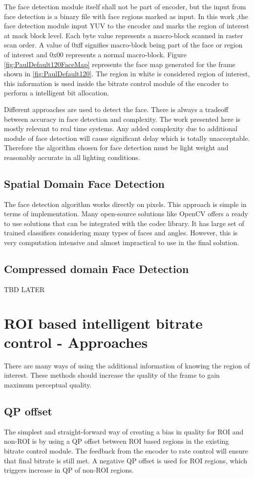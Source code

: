 \documentclass[11pt]{article} %
\begin{document}
 The face detection module itself shall not be part of encoder, but the input from face detection is a binary file with face regions marked as input. In this work ,the face detection module input YUV to the encoder and marks the region of interest at mack block level. Each byte value represents a macro-block scanned in raster scan order. A value of 0xff signifies macro-block being part of the face or region of interest and 0x00 represents a normal macro-block. Figure \ref{fig:PaulDefault120FaceMap} represents the face map generated for the frame shown in \ref{fig:PaulDefault120}. The region in white is considered region of interest, this information is used inside the bitrate control module of the encoder to perform a intelligent bit allocation.

Different approaches are used to detect the face. There is always a tradeoff between accuracy in face detection and complexity. The work presented here is mostly relevant to real time systems. Any added complexity due to additional module of face detection will cause significant delay which is totally unacceptable. Therefore the algorithm chosen for face detection must be light weight and reasonably accurate in all lighting conditions. 

\subsection{Spatial Domain Face Detection}
The face detection algorithm works directly on pixels. This approach is simple in terms of implementation. Many open-source solutions like OpenCV offers a ready to use solutions that can be integrated with the codec library. It has large set of trained classifiers considering many types of faces and angles. However, this is very computation intensive and almost impractical to use in the final solution. 
\subsection{Compressed domain Face Detection}
TBD LATER
%
%
% 
\section{ROI based intelligent bitrate control - Approaches}
There are many ways of using the additional information of knowing the region of interest. These methods should increase the quality of the frame to gain maximum perceptual quality.
\subsection{QP offset}
The simplest and straight-forward way of creating a bias in quality for ROI and non-ROI is by using a QP offset between ROI based regions in the existing bitrate control module. The feedback from the encoder to rate control will ensure that final bitrate is still met. A negative QP offset  is used for ROI regions, which triggers increase in QP of non-ROI regions. 
\end{document}
